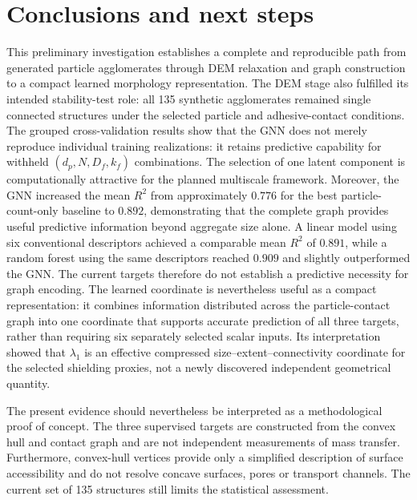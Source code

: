 \documentclass[12pt,a4paper]{article}
\begin{document}
\section{Conclusions and next steps}
\label{sec:conclusions}

This preliminary investigation establishes a complete and reproducible path
from generated particle agglomerates through DEM relaxation and graph
construction to a compact learned morphology representation. The DEM stage
also fulfilled its intended stability-test role: all 135 synthetic
agglomerates remained single connected structures under the selected particle
and adhesive-contact conditions. The grouped
cross-validation results show that the GNN does not merely reproduce individual
training realizations: it retains predictive capability for withheld
$(d_p,N,D_f,k_f)$ combinations. The selection of one latent component is
computationally attractive for the planned multiscale framework. Moreover, the
GNN increased the mean $R^2$ from approximately $0.776$ for the
best particle-count-only baseline to $0.892$, demonstrating that the complete
graph provides useful predictive information beyond aggregate size alone. A
linear model using six conventional descriptors achieved a comparable mean
$R^2$ of $0.891$, while a random forest using the same descriptors reached
$0.909$ and slightly outperformed the GNN. The current targets therefore do not
establish a predictive necessity for graph encoding. The learned coordinate is
nevertheless useful as a compact representation: it combines information
distributed across the particle-contact graph into one coordinate that supports
accurate prediction of all three targets, rather than requiring six separately
selected scalar inputs. Its interpretation showed that $\lambda_1$ is an
effective compressed size--extent--connectivity coordinate for the selected
shielding proxies, not a newly discovered independent geometrical quantity.

The present evidence should nevertheless be interpreted as a methodological
proof of concept. The three supervised targets are constructed from the convex
hull and contact graph and are not independent measurements of mass transfer.
Furthermore, convex-hull vertices provide only a simplified description of
surface accessibility and do not resolve concave surfaces, pores or transport
channels. The current set of 135 structures still limits the statistical
assessment.
\end{document}
